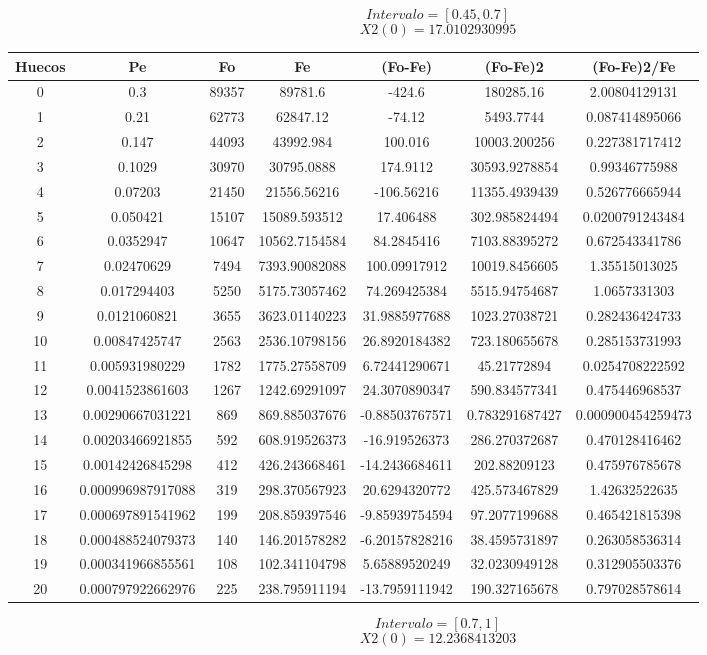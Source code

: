 \documentclass{article}
\begin{document}
$$
Intervalo = [0.45, 0.7]
$$
$$
X2(0) = 17.0102930995
$$
\begin{tabular}{|c|c|c|c|c|c|c|}
Huecos&Pe&Fo&Fe&(Fo{-}Fe)&(Fo{-}Fe)2&(Fo{-}Fe)2/Fe\\
\hline
0&0.3&89357&89781.6&{-}424.6&180285.16&2.00804129131\\
\hline
1&0.21&62773&62847.12&{-}74.12&5493.7744&0.087414895066\\
\hline
2&0.147&44093&43992.984&100.016&10003.200256&0.227381717412\\
\hline
3&0.1029&30970&30795.0888&174.9112&30593.9278854&0.99346775988\\
\hline
4&0.07203&21450&21556.56216&{-}106.56216&11355.4939439&0.526776665944\\
\hline
5&0.050421&15107&15089.593512&17.406488&302.985824494&0.0200791243484\\
\hline
6&0.0352947&10647&10562.7154584&84.2845416&7103.88395272&0.672543341786\\
\hline
7&0.02470629&7494&7393.90082088&100.09917912&10019.8456605&1.35515013025\\
\hline
8&0.017294403&5250&5175.73057462&74.269425384&5515.94754687&1.0657331303\\
\hline
9&0.0121060821&3655&3623.01140223&31.9885977688&1023.27038721&0.282436424733\\
\hline
10&0.00847425747&2563&2536.10798156&26.8920184382&723.180655678&0.285153731993\\
\hline
11&0.005931980229&1782&1775.27558709&6.72441290671&45.21772894&0.0254708222592\\
\hline
12&0.0041523861603&1267&1242.69291097&24.3070890347&590.834577341&0.475446968537\\
\hline
13&0.00290667031221&869&869.885037676&{-}0.88503767571&0.783291687427&0.000900454259473\\
\hline
14&0.00203466921855&592&608.919526373&{-}16.919526373&286.270372687&0.470128416462\\
\hline
15&0.00142426845298&412&426.243668461&{-}14.2436684611&202.88209123&0.475976785678\\
\hline
16&0.000996987917088&319&298.370567923&20.6294320772&425.573467829&1.42632522635\\
\hline
17&0.000697891541962&199&208.859397546&{-}9.85939754594&97.2077199688&0.465421815398\\
\hline
18&0.000488524079373&140&146.201578282&{-}6.20157828216&38.4595731897&0.263058536314\\
\hline
19&0.000341966855561&108&102.341104798&5.65889520249&32.0230949128&0.312905503376\\
\hline
20&0.000797922662976&225&238.795911194&{-}13.7959111942&190.327165678&0.797028578614\\
\end{tabular}
$$
Intervalo = [0.7, 1]
$$
$$
X2(0) = 12.2368413203
$$
\end{document}
